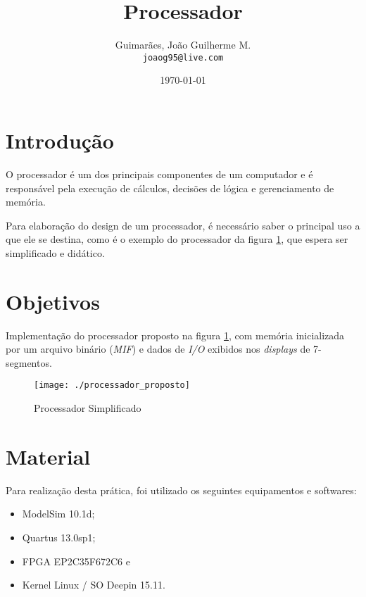 \documentclass[12pt, a4paper]{article}
\title{\textbf{Processador}}
\author{
	Guimarães, João Guilherme M.\\
	\texttt{joaog95@live.com}
}
\date{\today}
\begin{document}
	\maketitle
	
	\vspace{1.5cm}
	
	\section{Introdução}
	
	\par O processador é um dos principais componentes de um computador e é responsável pela execução de cálculos, decisões de lógica e gerenciamento de memória.
	
	\vspace{\baselineskip}
	
	\par Para elaboração do design de um processador, é necessário saber o principal uso a que ele se destina, como é o exemplo do processador da figura \ref{fig: processador implementado}, que espera ser simplificado e didático.
	
	\section{Objetivos}
	
	\par Implementação do processador proposto na figura \ref{fig: processador implementado}, com memória inicializada por um arquivo binário (\textit{MIF}) e dados de \textit{I/O} exibidos nos \textit{displays} de 7-segmentos.
	
	\begin{figure}[t]
		\centering
		\texttt{[image: ./processador\_proposto]}
		\caption{Processador Simplificado}
		\label{fig: processador implementado}
	\end{figure}
	
	\section{Material}
	
	\par Para realização desta prática, foi utilizado os seguintes equipamentos e softwares:
	
	\begin{itemize}
		\item ModelSim 10.1d;
		\item Quartus 13.0sp1;
		\item FPGA EP2C35F672C6 e
		\item Kernel Linux / SO Deepin 15.11.
	\end{itemize}
	
\end{document}
